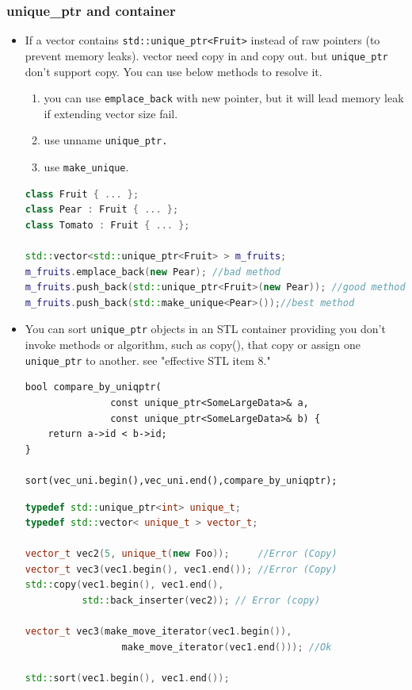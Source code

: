 \documentclass[a4paper,11pt,twoside]{book}
\begin{document}
\subsubsection{unique\_ptr and container}
\begin{itemize}
\item If a vector contains \texttt{std::unique\_ptr<Fruit>} instead of raw pointers (to prevent memory leaks). vector need copy in and copy out. but \texttt{unique\_ptr} don't support copy. You can use below methods to resolve it.
\begin{enumerate}
	\item you can use \texttt{emplace\_back} with new pointer, but it will lead memory leak if extending vector size fail.
	\item use unname \texttt{unique\_ptr.}
	\item use \texttt{make\_unique}.
\end{enumerate}
\begin{lstlisting}[frame=single, language=c++]
class Fruit { ... };
class Pear : Fruit { ... };
class Tomato : Fruit { ... };

std::vector<std::unique_ptr<Fruit> > m_fruits;
m_fruits.emplace_back(new Pear); //bad method
m_fruits.push_back(std::unique_ptr<Fruit>(new Pear)); //good method
m_fruits.push_back(std::make_unique<Pear>());//best method 
\end{lstlisting}

\item You can sort \texttt{unique\_ptr} objects in an STL container providing you don't invoke methods or algorithm, such as copy(), that copy or assign one \texttt{unique\_ptr} to another.  see "effective STL item 8."

\begin{lstlisting}[numbers=none]
bool compare_by_uniqptr(
               const unique_ptr<SomeLargeData>& a,
               const unique_ptr<SomeLargeData>& b) {
    return a->id < b->id;
}

sort(vec_uni.begin(),vec_uni.end(),compare_by_uniqptr);
\end{lstlisting}

\begin{lstlisting}[frame=single, language=c++]
typedef std::unique_ptr<int> unique_t;
typedef std::vector< unique_t > vector_t;

vector_t vec2(5, unique_t(new Foo));     //Error (Copy)
vector_t vec3(vec1.begin(), vec1.end()); //Error (Copy)
std::copy(vec1.begin(), vec1.end(),
          std::back_inserter(vec2)); // Error (copy)

vector_t vec3(make_move_iterator(vec1.begin()),
                 make_move_iterator(vec1.end())); //Ok

std::sort(vec1.begin(), vec1.end());
\end{lstlisting}

\end{itemize}
\end{document}
